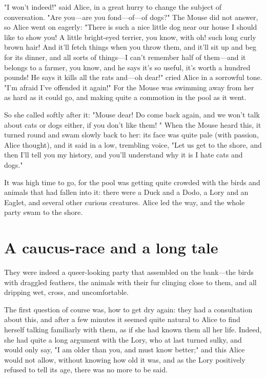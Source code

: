 "I won't indeed!" said Alice, in a great hurry to change the subject of conversation. "Are you—are you fond—of—of dogs?" The Mouse did not answer, so Alice went on eagerly: "There is such a nice little dog near our house I should like to show you! A little bright-eyed terrier, you know, with oh! such long curly brown hair! And it'll fetch things when you throw them, and it'll sit up and beg for its dinner, and all sorts of things—I can't remember half of them—and it belongs to a farmer, you know, and he says it's so useful, it's worth a hundred pounds! He says it kills all the rats and—oh dear!" cried Alice in a sorrowful tone. "I'm afraid I've offended it ​again!" For the Mouse was swimming away from her as hard as it could go, and making quite a commotion in the pool as it went.

So she called softly after it: "Mouse dear! Do come back again, and we won't talk about cats or dogs either, if you don't like them! " When the Mouse heard this, it turned round and swam slowly back to her: its face was quite pale (with passion, Alice thought), and it said in a low, trembling voice, "Let us get to the shore, and then I'll tell you my history, and you'll understand why it is I hate cats and dogs."

It was high time to go, for the pool was getting quite crowded with the birds and animals that had fallen into it: there were a Duck and a Dodo, a Lory and an Eaglet, and several other curious creatures. Alice led the way, and the whole party swam to the shore.

\quebra\chapter*{A caucus-race and a long tale}

They were indeed a queer-looking party that assembled on the bank—the birds with draggled feathers, the animals with their fur clinging close to them, and all dripping wet, cross, and uncomfortable.

The first question of course was, how to get dry again: they had a consultation about this, ​and after a few minutes it seemed quite natural to Alice to find herself talking familiarly with them, as if she had known them all her life. Indeed, she had quite a long argument with the Lory, who at last turned sulky, and would only say, "I am older than you, and must know better;" and this Alice would not allow, without knowing how old it was, and as the Lory positively refused to tell its age, there was no more to be said.

